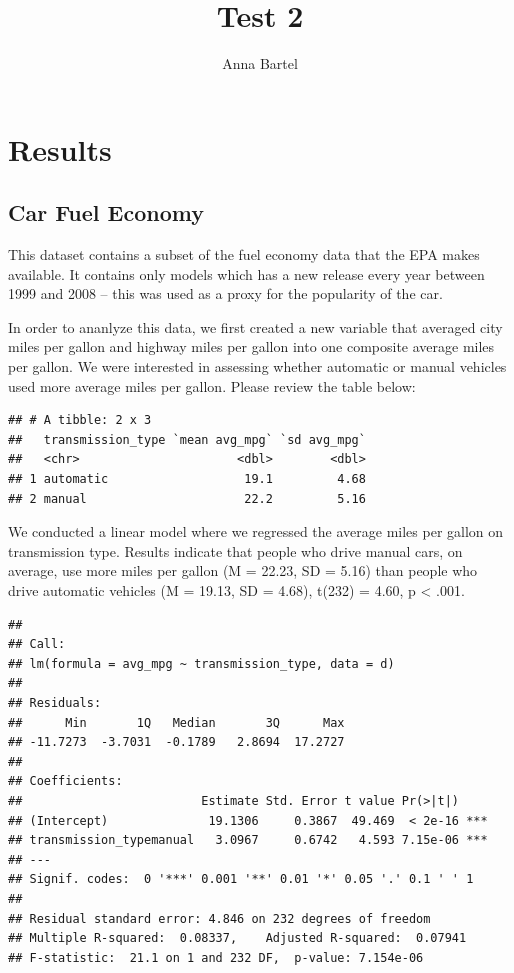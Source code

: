 \documentclass[
]{article}
\title{Test 2}
\author{Anna Bartel}
\date{}
\begin{document}
\maketitle

\hypertarget{results}{%
\section{Results}\label{results}}

\hypertarget{car-fuel-economy}{%
\subsection{Car Fuel Economy}\label{car-fuel-economy}}

This dataset contains a subset of the fuel economy data that the EPA
makes available. It contains only models which has a new release every
year between 1999 and 2008 -- this was used as a proxy for the
popularity of the car.

In order to ananlyze this data, we first created a new variable that
averaged city miles per gallon and highway miles per gallon into one
composite average miles per gallon. We were interested in assessing
whether automatic or manual vehicles used more average miles per gallon.
Please review the table below:

\begin{verbatim}
## # A tibble: 2 x 3
##   transmission_type `mean avg_mpg` `sd avg_mpg`
##   <chr>                      <dbl>        <dbl>
## 1 automatic                   19.1         4.68
## 2 manual                      22.2         5.16
\end{verbatim}

We conducted a linear model where we regressed the average miles per
gallon on transmission type. Results indicate that people who drive
manual cars, on average, use more miles per gallon (M = 22.23, SD =
5.16) than people who drive automatic vehicles (M = 19.13, SD = 4.68),
t(232) = 4.60, p \textless{} .001.

\begin{verbatim}
## 
## Call:
## lm(formula = avg_mpg ~ transmission_type, data = d)
## 
## Residuals:
##      Min       1Q   Median       3Q      Max 
## -11.7273  -3.7031  -0.1789   2.8694  17.2727 
## 
## Coefficients:
##                         Estimate Std. Error t value Pr(>|t|)    
## (Intercept)              19.1306     0.3867  49.469  < 2e-16 ***
## transmission_typemanual   3.0967     0.6742   4.593 7.15e-06 ***
## ---
## Signif. codes:  0 '***' 0.001 '**' 0.01 '*' 0.05 '.' 0.1 ' ' 1
## 
## Residual standard error: 4.846 on 232 degrees of freedom
## Multiple R-squared:  0.08337,    Adjusted R-squared:  0.07941 
## F-statistic:  21.1 on 1 and 232 DF,  p-value: 7.154e-06
\end{verbatim}
\end{document}
